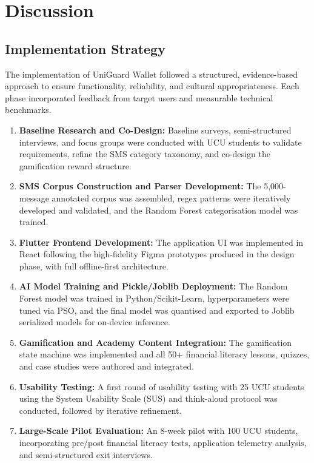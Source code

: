\documentclass[12pt]{report}
\begin{document}


\chapter{Discussion}
\label{ch:chapter-05}
\section{Implementation Strategy}

The implementation of UniGuard Wallet followed a structured, evidence-based approach
to ensure functionality, reliability, and cultural appropriateness. Each phase
incorporated feedback from target users and measurable technical benchmarks.

\begin{enumerate}
    \item \textbf{Baseline Research and Co-Design:} Baseline surveys, semi-structured interviews, and focus groups were conducted with UCU students to validate requirements, refine the SMS category taxonomy, and co-design the gamification reward structure.
    \item \textbf{SMS Corpus Construction and Parser Development:} The 5,000-message annotated corpus was assembled, regex patterns were iteratively developed and validated, and the Random Forest categorisation model was trained.
    \item \textbf{Flutter Frontend Development:} The application UI was implemented in React following the high-fidelity Figma prototypes produced in the design phase, with full offline-first architecture.
    \item \textbf{AI Model Training and Pickle/Joblib Deployment:} The Random Forest model was trained in Python/Scikit-Learn, hyperparameters were tuned via PSO, and the final model was quantised and exported to Joblib serialized models for on-device inference.
    \item \textbf{Gamification and Academy Content Integration:} The gamification state machine was implemented and all 50+ financial literacy lessons, quizzes, and case studies were authored and integrated.
    \item \textbf{Usability Testing:} A first round of usability testing with 25 UCU students using the System Usability Scale (SUS) and think-aloud protocol was conducted, followed by iterative refinement.
    \item \textbf{Large-Scale Pilot Evaluation:} An 8-week pilot with 100 UCU students, incorporating pre/post financial literacy tests, application telemetry analysis, and semi-structured exit interviews.
\end{enumerate}
\end{document}
